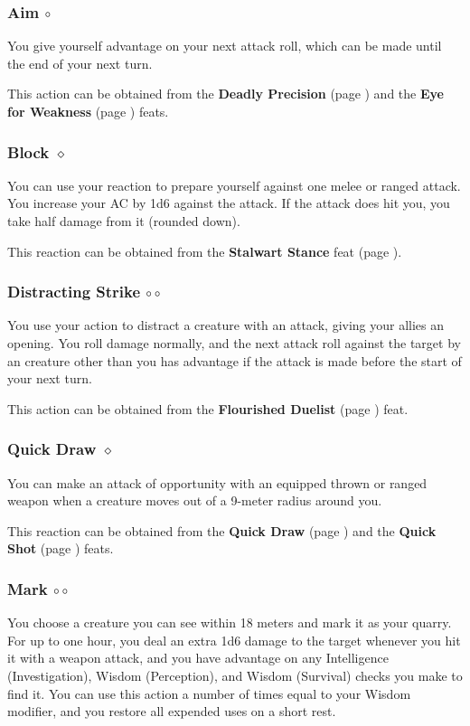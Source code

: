     \subsubsection{Aim $\circ$} \label{act::aim}
        You give yourself advantage on your next attack roll, which can be made until the end of your next turn.

        This action can be obtained from the \textbf{Deadly Precision} (page \pageref{feat::deadlyprecision}) and the \textbf{Eye for Weakness} (page \pageref{feat::eyeforweakness}) feats.
    \subsubsection{Block $\diamond$} \label{act::block}
        You can use your reaction to prepare yourself against one melee or ranged attack.
        You increase your AC by 1d6 against the attack.
        If the attack does hit you, you take half damage from it (rounded down).

        This reaction can be obtained from the \textbf{Stalwart Stance} feat (page \pageref{feat::stalwartstance}).
    \subsubsection{Distracting Strike $\circ\circ$} \label{act::distractingstrike}
        You use your action to distract a creature with an attack, giving your allies an opening.
        You roll damage normally, and the next attack roll against the target by an creature other than you has advantage if the attack is made before the start of your next turn.

        This action can be obtained from the \textbf{Flourished Duelist} (page \pageref{feat::flourishedduelist}) feat.
    \subsubsection{Quick Draw $\diamond$} \label{act::quickdraw}
        You can make an attack of opportunity with an equipped thrown or ranged weapon when a creature moves out of a 9-meter radius around you.

        This reaction can be obtained from the \textbf{Quick Draw} (page \pageref{feat::quickdraw}) and the \textbf{Quick Shot} (page \pageref{feat::quickshot}) feats.
    \subsubsection{Mark $\circ\circ$} \label{act::mark}
        You choose a creature you can see within 18 meters and mark it as your quarry.
        For up to one hour, you deal an extra 1d6 damage to the target whenever you hit it with a weapon attack, and you have advantage on any Intelligence (Investigation), Wisdom (Perception), and Wisdom (Survival) checks you make to find it.
        You can use this action a number of times equal to your Wisdom modifier, and you restore all expended uses on a short rest.


